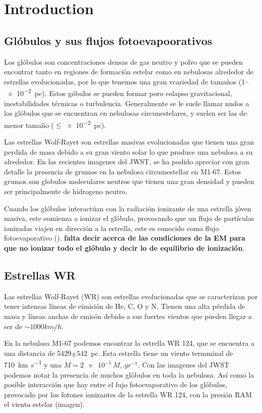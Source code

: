 \documentclass[twocolumn, times]{aastex631}
\begin{document}


\section{Introduction}
\label{sec:introduction}

\subsection{Glóbulos y sus flujos fotoevapoorativos}
Los glóbulos son concentraciones densas de gas neutro y polvo que se pueden encontrar tanto en regiones de formación estelar como en nebulosas alrededor de estrellas evolucionadas, por lo que tenemos una gran vcariedad de tamaños (1--\SI{e-2}{pc}). Estos góbulos se pueden formar poro colapso gravitacional, inestabilidades térmicas o turbulencia. Generalmente se le suele llamar nudos a los glóbulos que se encuentran en nebulosas circunestelares, y suelen ser las de menor tamaño ($\leq$\SI{e-2}{pc}).

Las estrellas Wolf-Rayet son estrellas masivas evolucionadas que tienen una gran perdida de masa debido a su gran viento solar lo que produce una nebulosa a su alrededor. En las recientes imagenes del JWST, se ha podido apreciar con gran detalle la presencia de grumos en la nebulosa circumestellar en M1-67. Estos grumos son globulos moleculares neutros que tienen una gran densidad y pueden ser principalmente de hidrogeno neutro. 

Cuando los glóbulos interactúan con la radiación ionizante de una estrella jóven masiva, este comienza a ionizar el glóbulo, provocando que un flujo de partículas ionizadas viajen en dirección a la estrella, este es conocido como flujo fotoevaporativo (). \textbf{falta decir acerca de las condiciones de la EM para que no ionizar todo el glóbulo y decir lo de equilibrio de ionización}.

\subsection{Estrellas WR}

Las estrellas Wolf-Rayet (WR) son estrellas evolucionadas que se caracterizan por tener intensas líneas de eimisión de  He, C, O y N. Tienen una alta pérdida de masa y líneas anchas de emisón debido a sus fuertes vientos que pueden llegar a ser de $\sim 1000 km/h$.

En la nebulosa M1-67 podemos encontrar la estrella WR 124, que se encuentra a una distancia de 5429$\pm$\SI{542}{pc}. Esta estrella tiene un viento termminal de \SI{710}{km.s^{-1}} y una $\dot{M}=\SI{2e-5}{M_\circ.yr^{-1}}$. Con las imagenes del JWST podemos notar la presencia de muchos glóbulos en toda la nebulosa. Así como la posible interacción que hay entre el fujo fotoevaporativo de los glóbulos, provocado por los fotones ionizantes de la estrella WR 124, con la presión RAM el viento estelar (imagen). 
\end{document}
